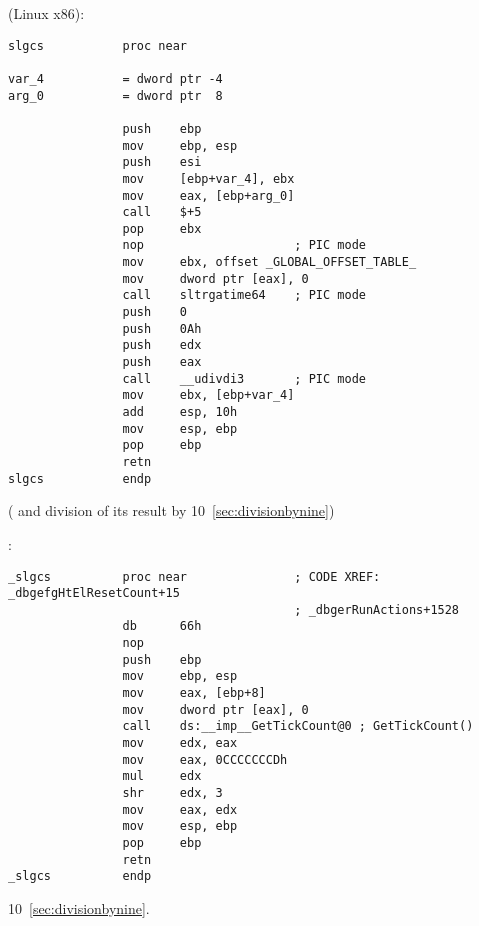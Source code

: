   (Linux x86):

\begin{lstlisting}
slgcs           proc near

var_4           = dword ptr -4
arg_0           = dword ptr  8

                push    ebp
                mov     ebp, esp
                push    esi
                mov     [ebp+var_4], ebx
                mov     eax, [ebp+arg_0]
                call    $+5
                pop     ebx
                nop                     ; PIC mode
                mov     ebx, offset _GLOBAL_OFFSET_TABLE_
                mov     dword ptr [eax], 0
                call    sltrgatime64    ; PIC mode
                push    0
                push    0Ah
                push    edx
                push    eax
                call    __udivdi3       ; PIC mode
                mov     ebx, [ebp+var_4]
                add     esp, 10h
                mov     esp, ebp
                pop     ebp
                retn
slgcs           endp
\end{lstlisting}

(  
{and division of its result by} 10~\ref{sec:divisionbynine})

:

\begin{lstlisting}
_slgcs          proc near               ; CODE XREF: _dbgefgHtElResetCount+15
                                        ; _dbgerRunActions+1528
                db      66h
                nop
                push    ebp
                mov     ebp, esp
                mov     eax, [ebp+8]
                mov     dword ptr [eax], 0
                call    ds:__imp__GetTickCount@0 ; GetTickCount()
                mov     edx, eax
                mov     eax, 0CCCCCCCDh
                mul     edx
                shr     edx, 3
                mov     eax, edx
                mov     esp, ebp
                pop     ebp
                retn
_slgcs          endp
\end{lstlisting}

  
 10~\ref{sec:divisionbynine}.


